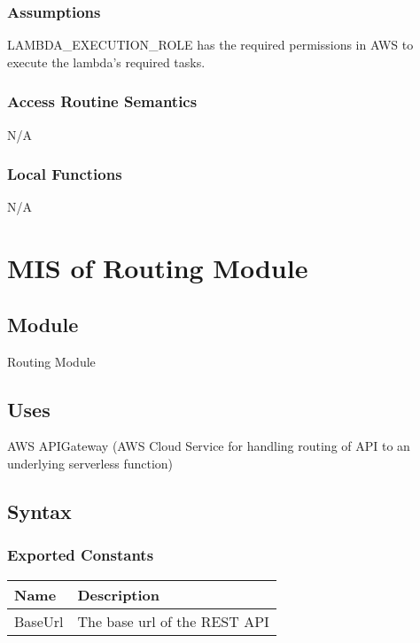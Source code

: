 \documentclass[12pt, titlepage]{article}
\begin{document}
\subsubsection{Assumptions}

LAMBDA\_EXECUTION\_ROLE has the required permissions in AWS to
execute the lambda's required tasks.

\subsubsection{Access Routine Semantics}

N/A

\subsubsection{Local Functions}

N/A

\section{MIS of Routing Module} \label{Module}

\subsection{Module}

Routing Module

\subsection{Uses}

AWS APIGateway (AWS Cloud Service for handling routing of API to an
underlying serverless function)

\subsection{Syntax}

\subsubsection{Exported Constants}

\begin{center}
  \begin{tabular}{p{4cm} p{12cm}}
    \hline
    \textbf{Name} & \textbf{Description} \\
    \hline
    BaseUrl & The base url of the REST API \\
    \hline
  \end{tabular}
\end{center}
\end{document}
